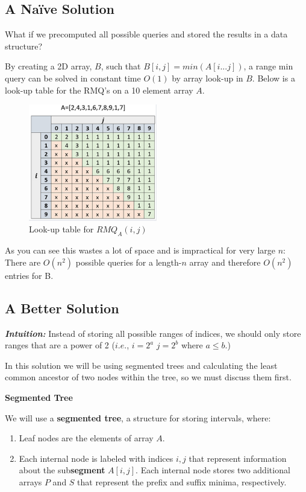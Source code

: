 \documentclass[twoside]{article}
\begin{document}
\newpage
\subsection{A Na{\"i}ve Solution}

What if we precomputed all possible queries and stored the results in a data structure?

By creating a 2D array, $B$, such that $B[i,j] = min(A[i...j])$, a range min query can be solved in constant time $O(1)$ by array look-up in $B$.  Below is a look-up table for the RMQ's on a 10 element array $A$.

\begin{figure}[h]
\centering
\includegraphics[width=0.5\textwidth]{lookup.jpg}
\caption{Look-up table for $RMQ_{A}(i,j)$}
\end{figure}


As you can see this wastes a lot of space and is impractical for very large $n$: There are $O(n^2)$ possible queries for a length-$n$ array and therefore $O(n^2)$ entries for B.



\subsection{A Better Solution}
\textit{\textbf{Intuition:}} Instead of storing all possible ranges of indices, we should only store ranges that are a power of 2 ($i.e.$, $i = 2^a$ $j = 2^b$ where $a \leq b$.)

In this solution we will be using segmented trees and calculating the least common ancestor of two nodes within the tree, so we must discuss them first.


\newpage
{\large \textbf{Segmented Tree}}

We will use a \textbf{segmented tree}, a structure for storing intervals, where:
\begin{enumerate}
  \item Leaf nodes are the elements of array $A$.
  \item Each internal node is labeled with indices $i,j$ that represent information about the sub\textbf{segment} $A[i,j]$.  Each internal node stores two additional arrays $P$ and $S$ that represent the prefix and suffix minima, respectively.
\end{enumerate}
\end{document}
